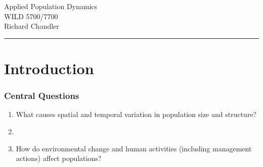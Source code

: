 \documentclass[color=usenames,dvipsnames]{beamer}
\begin{document}


\begin{frame}[plain]
  \begin{center}
    {\LARGE {Applied Population Dynamics} \\
     \Large WILD 5700/7700 \\ 
     \large
     Richard Chandler \\ }
   \vspace{3mm}
   \rule[0pt]{\textwidth}{0.1pt}
   \vspace{3mm}
  \end{center}

  {\setlength{\fboxsep}{0pt}
   \hfill
  }
\end{frame}




\section{Introduction}


\begin{frame}
\frametitle{Central Questions}
  \large \centering
  \begin{enumerate}[\bf 1.]
    \item What causes spatial and temporal variation in population size
    and structure? \par
    \item[]
    \item<2-> How do environmental change and human activities (including
      management actions) affect populations?
  \end{enumerate}
\end{frame}
\end{document}
